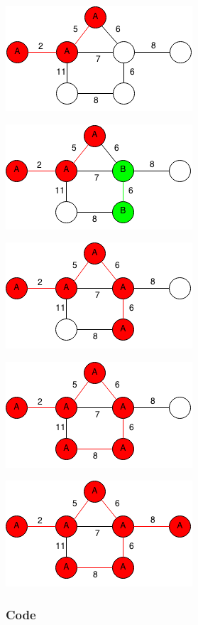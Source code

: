 \documentclass[11pt,oneside]{book}
\makeatletter
\def\maxwidth#1{\ifdim\Gin@nat@width>#1 #1\else\Gin@nat@width\fi}
\makeatother
\begin{document}
\includegraphics[width=\maxwidth{\textwidth}]{kruskal3.png}

\includegraphics[width=\maxwidth{\textwidth}]{kruskal4.png}

\includegraphics[width=\maxwidth{\textwidth}]{kruskal5.png}

\includegraphics[width=\maxwidth{\textwidth}]{kruskal6.png}

\includegraphics[width=\maxwidth{\textwidth}]{kruskal7.png}

\subsubsection{Code}
\end{document}
